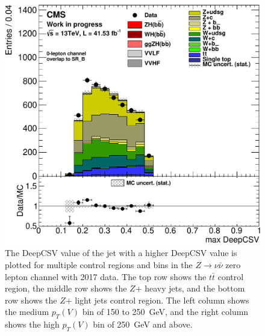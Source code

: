 \begin{figure}
  \includegraphics[width=0.42\linewidth]{figures/2017_Znn/Zlf_high_Znn__Hj0_DeepCSV_.pdf}
  \caption[Control region plots for zero lepton in 2017]{
    The DeepCSV value of the jet with a higher DeepCSV value
    is plotted for multiple control regions and bins in
    the $Z\rightarrow \nu\bar{\nu}$ zero lepton channel with 2017 data.
    The top row shows the $t\bar{t}$ control region,
    the middle row shows the $Z$+ heavy jets,
    and the bottom row shows the $Z$+ light jets control region.
    The left column shows the medium $p_T(V)$ bin of 150 to \SI{250}{GeV},
    and the right column shows the high $p_T(V)$ bin of \SI{250}{GeV} and above.
  }
  \label{fig:2017_Znn_j0csv}
\end{figure}

